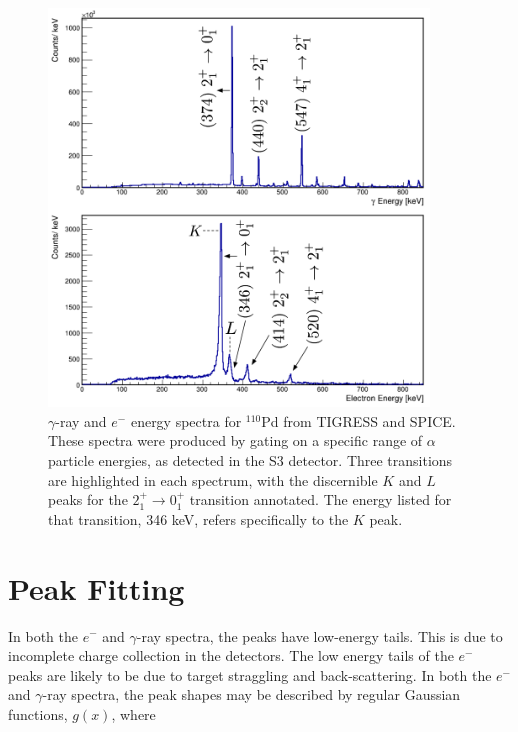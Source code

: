 \begin{figure}[!ht]
  \centering
  \includegraphics[width=0.9\textwidth]{techniques_alpha_spectra.png}
  \caption[The $\alpha$-particle gated $\gamma$-ray spectrum and the $\alpha$-particle gated $e^-$ spectrum.]{$\gamma$-ray and $e^-$ energy spectra for $^{110}$Pd from TIGRESS and SPICE. These spectra were produced by gating on a specific range of $\alpha$ particle energies, as detected in the S3 detector. Three transitions are highlighted in each spectrum, with the discernible $K$ and $L$ peaks for the $2^+_1 \rightarrow 0^+_1$ transition annotated. The energy listed for that transition, 346 keV, refers specifically to the $K$ peak.}
  \label{figure:spectrum_sample}
\end{figure}

\section{Peak Fitting}
\label{sec: Peak Fitting}

In both the $e^-$ and $\gamma$-ray spectra, the peaks have low-energy tails. This is due to incomplete charge collection in the detectors. The low energy tails of the $e^-$ peaks are likely to be due to target straggling and back-scattering. In both the $e^-$ and $\gamma$-ray spectra, the peak shapes may be described by regular Gaussian functions, $g(x)$, where

